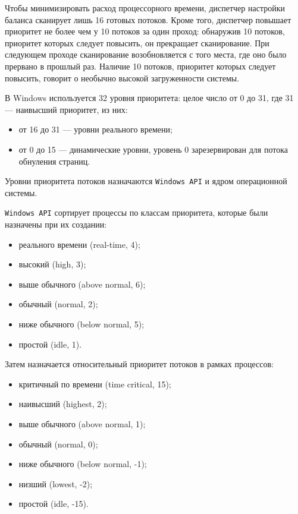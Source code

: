 Чтобы минимизировать расход процессорного времени, диспетчер настройки баланса сканирует лишь 16 готовых потоков. Кроме того, диспетчер повышает приоритет не более чем у 10 потоков за один проход: обнаружив 10 потоков, приоритет которых следует повысить, он прекращает сканирование. При следующем проходе сканирование возобновляется с того места, где оно было прервано в прошлый раз. Наличие 10 потоков, приоритет которых следует повысить, говорит о необычно высокой загруженности системы.


В Windows используется 32 уровня приоритета: целое число от 0 до 31, где 31 --- наивысший приоритет, из них:
\begin{itemize}
    \item от 16 до 31 --- уровни реального времени;
    \item от 0 до 15 --- динамические уровни, уровень 0 зарезервирован для потока обнуления страниц.
\end{itemize}

Уровни приоритета потоков назначаются \texttt{Windows API} и ядром операционной системы.

\texttt{Windows API} сортирует процессы по классам приоритета, которые были назначены при их создании:
\begin{itemize}
    \item реального времени (real-time, 4);
    \item высокий (high, 3);
    \item выше обычного (above normal, 6);
    \item обычный (normal, 2);
    \item ниже обычного (below normal, 5);
    \item простой (idle, 1).
\end{itemize}

Затем назначается относительный приоритет потоков в рамках процессов:

\begin{itemize}
    \item критичный по времени (time critical, 15);
    \item наивысший (highest, 2);
    \item выше обычного (above normal, 1);
    \item обычный (normal, 0);
    \item ниже обычного (below normal, -1);
    \item низший (lowest, -2);
    \item простой (idle, -15).
\end{itemize}


